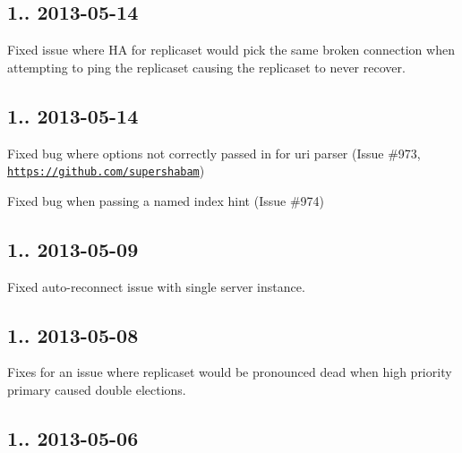 \subsection*{1.. 2013-\/05-\/14 }


\begin{DoxyItemize}
\item Fixed issue where HA for replicaset would pick the same broken connection when attempting to ping the replicaset causing the replicaset to never recover.
\end{DoxyItemize}

\subsection*{1.. 2013-\/05-\/14 }


\begin{DoxyItemize}
\item Fixed bug where options not correctly passed in for uri parser (Issue \#973, \href{https://github.com/supershabam}{\tt https\+://github.\+com/supershabam})
\item Fixed bug when passing a named index hint (Issue \#974)
\end{DoxyItemize}

\subsection*{1.. 2013-\/05-\/09 }


\begin{DoxyItemize}
\item Fixed auto-\/reconnect issue with single server instance.
\end{DoxyItemize}

\subsection*{1.. 2013-\/05-\/08 }


\begin{DoxyItemize}
\item Fixes for an issue where replicaset would be pronounced dead when high priority primary caused double elections.
\end{DoxyItemize}

\subsection*{1.. 2013-\/05-\/06 }


